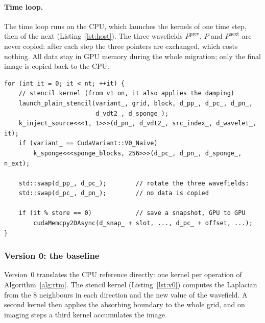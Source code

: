 \documentclass[letterpaper,11pt,leqno]{article}
\begin{document}
\paragraph{Time loop.}
The time loop runs on the CPU, which launches the kernels of one time step,
then of the next (Listing~\ref{lst:host}). The three wavefields
$P^{\mathrm{prev}}$, $P$ and $P^{\mathrm{next}}$ are never copied: after each
step the three pointers are exchanged, which costs nothing. All data stay in
GPU memory during the whole migration; only the final image is copied back to
the CPU.

\noindent\begin{minipage}{\linewidth}
\begin{lstlisting}[style=cuda, caption={Forward time loop on the CPU (simplified).}, label={lst:host}]
for (int it = 0; it < nt; ++it) {
    // stencil kernel (from v1 on, it also applies the damping)
    launch_plain_stencil(variant_, grid, block, d_pp_, d_pc_, d_pn_,
                         d_vdt2_, d_sponge_);
    k_inject_source<<<1, 1>>>(d_pn_, d_vdt2_, src_index_, d_wavelet_, it);
    if (variant_ == CudaVariant::V0_Naive)
        k_sponge<<<sponge_blocks, 256>>>(d_pc_, d_pn_, d_sponge_, n_ext);

    std::swap(d_pp_, d_pc_);        // rotate the three wavefields:
    std::swap(d_pc_, d_pn_);        // no data is copied

    if (it % store == 0)            // save a snapshot, GPU to GPU
        cudaMemcpy2DAsync(d_snap_ + slot, ..., d_pc_ + offset, ...);
}
\end{lstlisting}
\end{minipage}

\subsubsection{Version 0: the baseline}

Version~0 translates the CPU reference directly: one kernel per operation of
Algorithm~\ref{alg:rtm}. The stencil kernel (Listing~\ref{lst:v0}) computes
the Laplacian from the 8 neighbours in each direction and the new value of the
wavefield. A second kernel then applies the absorbing boundary to the whole
grid, and on imaging steps a third kernel accumulates the image.
\end{document}
